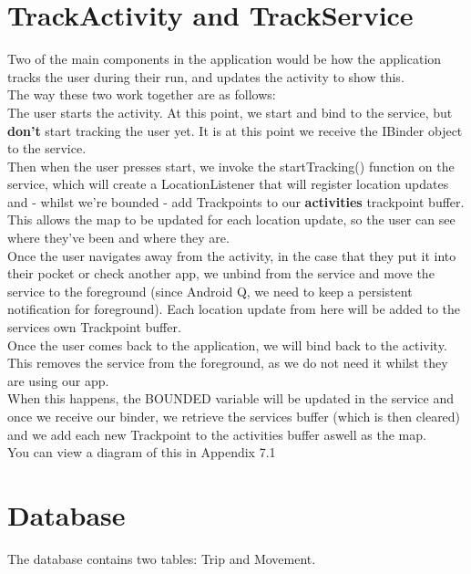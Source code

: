 \documentclass[11pt]{article}
\begin{document}
\section{TrackActivity and TrackService}

Two of the main components in the application would be how the application tracks the user during their run, and updates the activity to show this.  \\
The way these two work together are as follows: \\

The user starts the activity. At this point, we start and bind to the service, but \textbf{don't} start tracking the user yet. It is at this point we receive the IBinder object to the service.\\ 

Then when the user presses start, we invoke the startTracking() function on the service, which will create a LocationListener that will register location updates and - whilst we're bounded - add Trackpoints to our \textbf{activities} trackpoint buffer. This allows the map to be updated for each location update, so the user can see where they've been and where they are. \\

Once the user navigates away from the activity, in the case that they put it into their pocket or check another app, we unbind from the service and move the service to the foreground (since Android Q, we need to keep a persistent notification for foreground). Each location update from here will be added to the services own Trackpoint buffer. \\ 

Once the user comes back to the application, we will bind back to the activity. This removes the service from the foreground, as we do not need it whilst they are using our app. \\
When this happens, the BOUNDED variable will be updated in the service and once we receive our binder, we retrieve the services buffer (which is then cleared) and we add each new Trackpoint to the activities buffer aswell as the map. \\

You can view a diagram of this in Appendix 7.1

\section{Database}

The database contains two tables: Trip and Movement.
\end{document}
